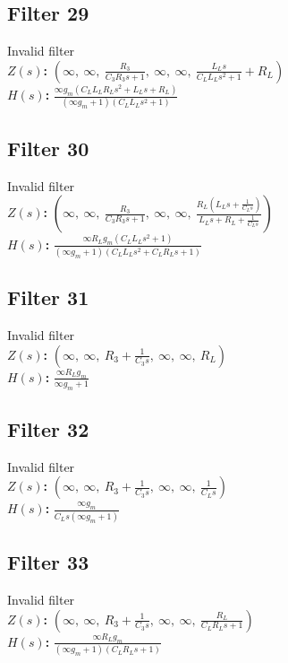 \documentclass{article}
\begin{document}
\subsection*{Filter 29}
Invalid filter \\ 
\textbf{$Z(s)$:} $\left( \infty, \  \infty, \  \frac{R_{3}}{C_{3} R_{3} s + 1}, \  \infty, \  \infty, \  \frac{L_{L} s}{C_{L} L_{L} s^{2} + 1} + R_{L}\right)$ \\ 
\textbf{$H(s)$:} $\frac{\infty g_{m} \left(C_{L} L_{L} R_{L} s^{2} + L_{L} s + R_{L}\right)}{\left(\infty g_{m} + 1\right) \left(C_{L} L_{L} s^{2} + 1\right)}$ \\ 
\subsection*{Filter 30}
Invalid filter \\ 
\textbf{$Z(s)$:} $\left( \infty, \  \infty, \  \frac{R_{3}}{C_{3} R_{3} s + 1}, \  \infty, \  \infty, \  \frac{R_{L} \left(L_{L} s + \frac{1}{C_{L} s}\right)}{L_{L} s + R_{L} + \frac{1}{C_{L} s}}\right)$ \\ 
\textbf{$H(s)$:} $\frac{\infty R_{L} g_{m} \left(C_{L} L_{L} s^{2} + 1\right)}{\left(\infty g_{m} + 1\right) \left(C_{L} L_{L} s^{2} + C_{L} R_{L} s + 1\right)}$ \\ 
\subsection*{Filter 31}
Invalid filter \\ 
\textbf{$Z(s)$:} $\left( \infty, \  \infty, \  R_{3} + \frac{1}{C_{3} s}, \  \infty, \  \infty, \  R_{L}\right)$ \\ 
\textbf{$H(s)$:} $\frac{\infty R_{L} g_{m}}{\infty g_{m} + 1}$ \\ 
\subsection*{Filter 32}
Invalid filter \\ 
\textbf{$Z(s)$:} $\left( \infty, \  \infty, \  R_{3} + \frac{1}{C_{3} s}, \  \infty, \  \infty, \  \frac{1}{C_{L} s}\right)$ \\ 
\textbf{$H(s)$:} $\frac{\infty g_{m}}{C_{L} s \left(\infty g_{m} + 1\right)}$ \\ 
\subsection*{Filter 33}
Invalid filter \\ 
\textbf{$Z(s)$:} $\left( \infty, \  \infty, \  R_{3} + \frac{1}{C_{3} s}, \  \infty, \  \infty, \  \frac{R_{L}}{C_{L} R_{L} s + 1}\right)$ \\ 
\textbf{$H(s)$:} $\frac{\infty R_{L} g_{m}}{\left(\infty g_{m} + 1\right) \left(C_{L} R_{L} s + 1\right)}$ \\ 
\end{document}

